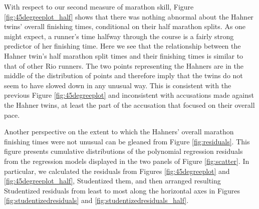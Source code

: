 \documentclass[12pt,titlepage]{article}
\begin{document}
With respect to our second measure of marathon skill, Figure
\ref{fig:45degreeplot_half} shows that there was nothing abnormal
about the Hahner twins' overall finishing times, conditional on their
half marathon splits. As one might expect, a runner's time halfway
through the course is a fairly strong predictor of her finishing time.
Here we see that the relationship between the Hahner twin's half
marathon split times and their finishing times is similar to that of
other Rio runners.  The two points representing the Hahners are in the
middle of the distribution of points and therefore imply that the
twins do not seem to have slowed down in any unusual way.  This is
consistent with the previous Figure \ref{fig:45degreeplot} and
inconsistent with accusations made against the Hahner twins, at least
the part of the accusation that focused on their overall pace.

Another perspective on the extent to which the Hahners' overall
marathon finishing times were not unusual can be gleaned from Figure
\ref{fig:residuals}.  This figure presents cumulative distributions of
the polynomial regression residuals from the regression models
displayed in the two panels of Figure \ref{fig:scatter}.  In
particular, we calculated the residuals from Figures
\ref{fig:45degreeplot} and \ref{fig:45degreeplot_half}, Studentized
them, and then arranged resulting Studentized residuals from least to
most along the horizontal axes in Figures
\ref{fig:studentizedresiduals} and
\ref{fig:studentizedresiduals_half}.\label{residualplots}
\end{document}
